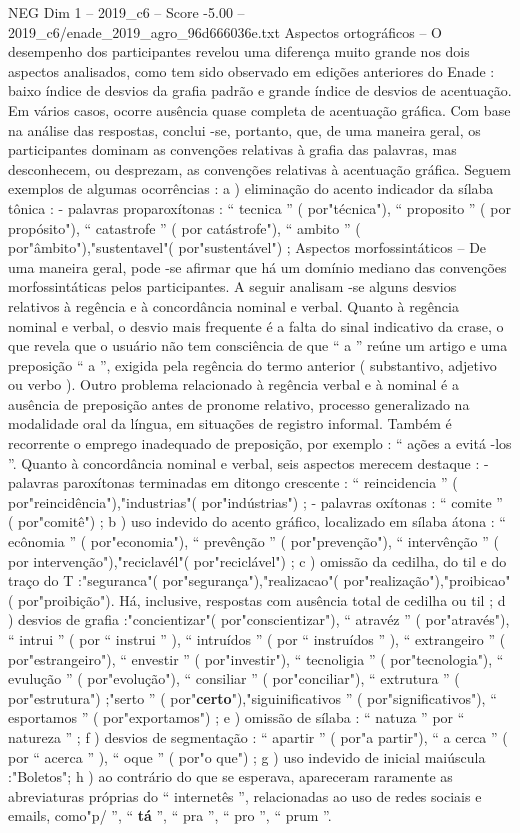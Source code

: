 \begin{textsample}{NEG Dim 1 – 2019\_c6 – Score -5.00 – 2019\_c6/enade\_2019\_agro\_96d666036e.txt}
Aspectos ortográficos – O desempenho dos participantes revelou uma diferença muito grande nos dois aspectos analisados, como tem sido observado em edições anteriores do Enade : baixo índice de desvios da grafia padrão e grande índice de desvios de acentuação.
Em vários casos, ocorre ausência quase completa de acentuação gráfica.
Com base na análise das respostas, conclui -se, portanto, que, de uma maneira geral, os participantes dominam as convenções relativas à grafia das palavras, mas desconhecem, ou desprezam, as convenções relativas à acentuação gráfica.
Seguem exemplos de algumas ocorrências : a ) eliminação do acento indicador da sílaba tônica : - palavras proparoxítonas : “ tecnica ” ( por"técnica"), “ proposito ” ( por propósito"), “ catastrofe ” ( por catástrofe"), “ ambito ” ( por"âmbito"),"sustentavel"( por"sustentável") ; Aspectos morfossintáticos – De uma maneira geral, pode -se afirmar que há um domínio mediano das convenções morfossintáticas pelos participantes.
A seguir analisam -se alguns desvios relativos à regência e à concordância nominal e verbal.
Quanto à regência nominal e verbal, o desvio mais frequente é a falta do sinal indicativo da crase, o que revela que o usuário não tem consciência de que “ a ” reúne um artigo e uma preposição “ a ”, exigida pela regência do termo anterior ( substantivo, adjetivo ou verbo ).
Outro problema relacionado à regência verbal e à nominal é a ausência de preposição antes de pronome relativo, processo generalizado na modalidade oral da língua, em situações de registro informal.
Também é recorrente o emprego inadequado de preposição, por exemplo : “ ações a evitá -los ”.
Quanto à concordância nominal e verbal, seis aspectos merecem destaque : - palavras paroxítonas terminadas em ditongo crescente : “ reincidencia ” ( por"reincidência"),"industrias"( por"indústrias") ; - palavras oxítonas : “ comite ” ( por"comitê") ; b ) uso indevido do acento gráfico, localizado em sílaba átona : “ ecônomia ” ( por"economia"), “ prevênção ” ( por"prevenção"), “ intervênção ” ( por intervenção"),"reciclavél"( por"reciclável") ; c ) omissão da cedilha, do til e do traço do T :"seguranca"( por"segurança"),"realizacao"( por"realização"),"proibicao"( por"proibição").
Há, inclusive, respostas com ausência total de cedilha ou til ; d ) desvios de grafia :"concientizar"( por"conscientizar"), “ atravéz ” ( por"através"), “ intrui ” ( por “ instrui ” ), “ intruídos ” ( por “ instruídos ” ), “ extrangeiro ” ( por"estrangeiro"), “ envestir ” ( por"investir"), “ tecnoligia ” ( por"tecnologia"), “ evulução ” ( por"evolução"), “ consiliar ” ( por"conciliar"), “ extrutura ” ( por"estrutura") ;"serto ” ( por"\textbf{certo}"),"siguinificativos ” ( por"significativos"), “ esportamos ” ( por"exportamos") ; e ) omissão de sílaba : “ natuza ” por “ natureza ” ; f ) desvios de segmentação : “ apartir ” ( por"a partir"), “ a cerca ” ( por “ acerca ” ), “ oque ” ( por"o que") ; g ) uso indevido de inicial maiúscula :"Boletos"; h ) ao contrário do que se esperava, apareceram raramente as abreviaturas próprias do “ internetês ”, relacionadas ao uso de redes sociais e emails, como"p/ ”, “ \textbf{tá} ”, “ pra ”, “ pro ”, “ prum ”.

\end{textsample}
